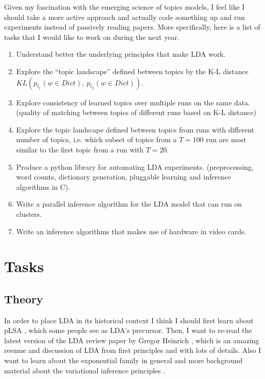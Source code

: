 \documentclass[letterpaper,11pt]{article}
\begin{document}
	Given my fascination with the emerging science of topics models, I feel like I should take a more
	active approach and actually code something up and run experiments 
	instead of passively reading papers.
	More specifically, here is a list of tasks that I would like to work on
	during the next year.
	
	\begin{enumerate}
		\item	Understand better the underlying principles 
				that make LDA work.
		\item	Explore the ``topic landscape'' defined between
				topics by the K-L distance ${KL}(p_{t_1}(w\in Dict),\ p_{t_2}(w \in Dict))$.
		\item	Explore consistency of learned topics over multiple runs on the same
				data. (quality of matching between topics of different runs based on K-L distance)
		\item	Explore the topic landscape defined between topics from runs with different
				number of topics, i.e. which subset of topics from a $T=100$ run are most 
				similar to the first topic from a run with $T=20$. 
		\item	Produce a python library for automating LDA
				experiments.
				(preprocessing, word counts, dictionary generation, 
				pluggable learning and inference algorithms in C).
		\item	Write a parallel inference algorithm for the LDA model that
				can run on clusters.
		\item	Write an inference algorithms that makes use of hardware 
				in video cards.
	\end{enumerate}
	
	
	
\section{Tasks}


	\subsection{Theory}
	
		In order to place LDA in its historical context I think I should first learn about pLSA \cite{hofmann1999probabilistic}, 
		which some people see as LDA's precursor. 
		Then, I want to re-read the latest version of the LDA review paper by Gregor Heinrich \cite{heinrich2005parameter},
		which is an amazing resume and discussion of LDA from first principles and with lots of details.
		Also I want to learn about the exponential family in general and more background material
		about the variational inference principles  \cite{wainwright2008graphical}.
		
\end{document}
